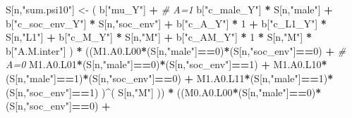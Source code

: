 \documentclass[
]{book}
\newenvironment{Shaded}{\begin{snugshade}}{\end{snugshade}}
\newcommand{\CommentTok}[1]{\textcolor[rgb]{0.56,0.35,0.01}{\textit{#1}}}
\newcommand{\DecValTok}[1]{\textcolor[rgb]{0.00,0.00,0.81}{#1}}
\newcommand{\NormalTok}[1]{#1}
\newcommand{\OtherTok}[1]{\textcolor[rgb]{0.56,0.35,0.01}{#1}}
\newcommand{\SpecialCharTok}[1]{\textcolor[rgb]{0.81,0.36,0.00}{\textbf{#1}}}
\newcommand{\StringTok}[1]{\textcolor[rgb]{0.31,0.60,0.02}{#1}}
\begin{document}
\begin{Shaded}
\begin{Highlighting}[]
\NormalTok{    S[n,}\StringTok{"sum.psi10"}\NormalTok{] }\OtherTok{\textless{}{-}}\NormalTok{  ( b[}\StringTok{"mu\_Y"}\NormalTok{] }\SpecialCharTok{+}                                          \CommentTok{\# A=1}
\NormalTok{                             b[}\StringTok{"c\_male\_Y"}\NormalTok{] }\SpecialCharTok{*}\NormalTok{ S[n,}\StringTok{"male"}\NormalTok{] }\SpecialCharTok{+} 
\NormalTok{                             b[}\StringTok{"c\_soc\_env\_Y"}\NormalTok{] }\SpecialCharTok{*}\NormalTok{ S[n,}\StringTok{"soc\_env"}\NormalTok{] }\SpecialCharTok{+} 
\NormalTok{                             b[}\StringTok{"c\_A\_Y"}\NormalTok{] }\SpecialCharTok{*} \DecValTok{1} \SpecialCharTok{+}
\NormalTok{                             b[}\StringTok{"c\_L1\_Y"}\NormalTok{] }\SpecialCharTok{*}\NormalTok{ S[n,}\StringTok{"L1"}\NormalTok{] }\SpecialCharTok{+}
\NormalTok{                             b[}\StringTok{"c\_M\_Y"}\NormalTok{] }\SpecialCharTok{*}\NormalTok{ S[n,}\StringTok{"M"}\NormalTok{] }\SpecialCharTok{+}
\NormalTok{                             b[}\StringTok{"c\_AM\_Y"}\NormalTok{] }\SpecialCharTok{*} \DecValTok{1} \SpecialCharTok{*}\NormalTok{ S[n,}\StringTok{"M"}\NormalTok{] }\SpecialCharTok{*}\NormalTok{ b[}\StringTok{"A.M.inter"}\NormalTok{] ) }\SpecialCharTok{*}
\NormalTok{      ((M1.A0.L00}\SpecialCharTok{*}\NormalTok{(S[n,}\StringTok{"male"}\NormalTok{]}\SpecialCharTok{==}\DecValTok{0}\NormalTok{)}\SpecialCharTok{*}\NormalTok{(S[n,}\StringTok{"soc\_env"}\NormalTok{]}\SpecialCharTok{==}\DecValTok{0}\NormalTok{) }\SpecialCharTok{+}                    \CommentTok{\# A\textquotesingle{}=0}
\NormalTok{          M1.A0.L01}\SpecialCharTok{*}\NormalTok{(S[n,}\StringTok{"male"}\NormalTok{]}\SpecialCharTok{==}\DecValTok{0}\NormalTok{)}\SpecialCharTok{*}\NormalTok{(S[n,}\StringTok{"soc\_env"}\NormalTok{]}\SpecialCharTok{==}\DecValTok{1}\NormalTok{) }\SpecialCharTok{+}
\NormalTok{          M1.A0.L10}\SpecialCharTok{*}\NormalTok{(S[n,}\StringTok{"male"}\NormalTok{]}\SpecialCharTok{==}\DecValTok{1}\NormalTok{)}\SpecialCharTok{*}\NormalTok{(S[n,}\StringTok{"soc\_env"}\NormalTok{]}\SpecialCharTok{==}\DecValTok{0}\NormalTok{) }\SpecialCharTok{+} 
\NormalTok{          M1.A0.L11}\SpecialCharTok{*}\NormalTok{(S[n,}\StringTok{"male"}\NormalTok{]}\SpecialCharTok{==}\DecValTok{1}\NormalTok{)}\SpecialCharTok{*}\NormalTok{(S[n,}\StringTok{"soc\_env"}\NormalTok{]}\SpecialCharTok{==}\DecValTok{1}\NormalTok{) )}\SpecialCharTok{\^{}}\NormalTok{( S[n,}\StringTok{"M"}\NormalTok{] )) }\SpecialCharTok{*}
\NormalTok{      ((M0.A0.L00}\SpecialCharTok{*}\NormalTok{(S[n,}\StringTok{"male"}\NormalTok{]}\SpecialCharTok{==}\DecValTok{0}\NormalTok{)}\SpecialCharTok{*}\NormalTok{(S[n,}\StringTok{"soc\_env"}\NormalTok{]}\SpecialCharTok{==}\DecValTok{0}\NormalTok{) }\SpecialCharTok{+}                

\end{Highlighting}
\end{Shaded}
\end{document}
